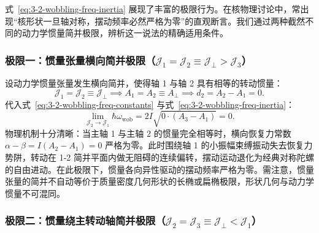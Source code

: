 式~\eqref{eq:3-2-wobbling-freq-inertia} 展现了丰富的极限行为。在核物理讨论中，常出现“核形状一旦轴对称，摆动频率必然严格为零”的直观断言。我们通过两种截然不同的动力学惯量简并极限，辨析这一说法的精确适用条件。

\subsubsection{极限一：惯量张量横向简并极限（$\mathcal{J}_1 = \mathcal{J}_2 \equiv \mathcal{J}_\perp > \mathcal{J}_3$）}

设动力学惯量张量发生横向简并，使得轴 1 与轴 2 具有相等的转动惯量：
\begin{equation}\label{eq:3-2-limit1-def}
\mathcal{J}_1 = \mathcal{J}_2 \equiv \mathcal{J}_\perp \implies A_1 = A_2 \equiv A_\perp \implies d_2 = A_2 - A_1 = 0.
\end{equation}
代入式~\eqref{eq:3-2-wobbling-freq-constants} 与式~\eqref{eq:3-2-wobbling-freq-inertia}：
\begin{equation}\label{eq:3-2-limit1-zero}
\lim_{\mathcal{J}_2 \to \mathcal{J}_1} \hbar \omega_{\text{wob}} = 2I \sqrt{0 \cdot (A_3 - A_1)} = 0.
\end{equation}
物理机制十分清晰：当主轴 1 与主轴 2 的惯量完全相等时，横向恢复力常数 $\alpha - \beta = I(A_2 - A_1) = 0$ 严格为零。此时围绕轴 1 的小振幅束缚振动失去恢复力势阱，转动在 1-2 简并平面内做无阻碍的连续偏转，摆动运动退化为经典对称陀螺的自由进动。在此极限下，惯量各向异性驱动的摆动频率严格为零。需注意，惯量张量的简并不自动等价于质量密度几何形状的长椭或扁椭极限，形状几何与动力学惯量不可混同。

\subsubsection{极限二：惯量绕主转动轴简并极限（$\mathcal{J}_2 = \mathcal{J}_3 \equiv \mathcal{J}_\perp < \mathcal{J}_1$）}

